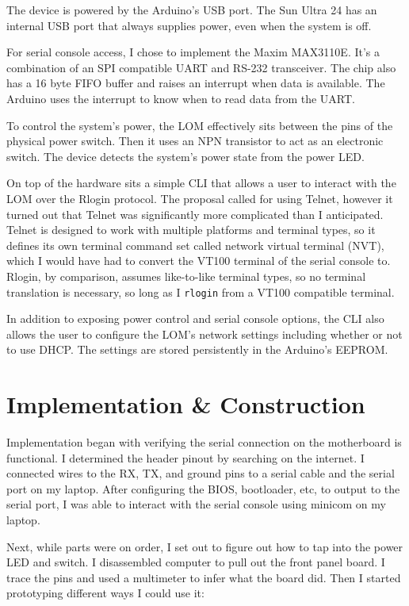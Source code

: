 \documentclass{amsart}
\begin{document}
The device is powered by the Arduino's USB port.  The Sun Ultra 24 has an internal USB port that always supplies power, even when the system is off.

For serial console access, I chose to implement the Maxim MAX3110E.  It's a combination of an SPI compatible UART and RS-232 transceiver.  The chip also has a 16 byte FIFO buffer and raises an interrupt when data is available.  The Arduino uses the interrupt to know when to read data from the UART.

To control the system's power, the LOM effectively sits between the pins of the physical power switch.  Then it uses an NPN transistor to act as an electronic switch.  The device detects the system's power state from the power LED.

On top of the hardware sits a simple CLI that allows a user to interact with the LOM over the Rlogin protocol.  The proposal called for using Telnet, however it turned out that Telnet was significantly more complicated than I anticipated.  Telnet is designed to work with multiple platforms and terminal types, so it defines its own terminal command set called network virtual terminal (NVT), which I would have had to convert the VT100 terminal of the serial console to.  Rlogin, by comparison, assumes like-to-like terminal types, so no terminal translation is necessary, so long as I \texttt{rlogin} from a VT100 compatible terminal.

In addition to exposing power control and serial console options, the CLI also allows the user to configure the LOM's network settings including whether or not to use DHCP.  The settings are stored persistently in the Arduino's EEPROM.

\section{Implementation \& Construction}

Implementation began with verifying the serial connection on the motherboard is functional.  I determined the header pinout by searching on the internet.  I connected wires to the RX, TX, and ground pins to a serial cable and the serial port on my laptop.  After configuring the BIOS, bootloader, etc, to output to the serial port, I was able to interact with the serial console using minicom on my laptop.

Next, while parts were on order, I set out to figure out how to tap into the power LED and switch.  I disassembled computer to pull out the front panel board.  I trace the pins and used a multimeter to infer what the board did.  Then I started prototyping different ways I could use it:
\end{document}
